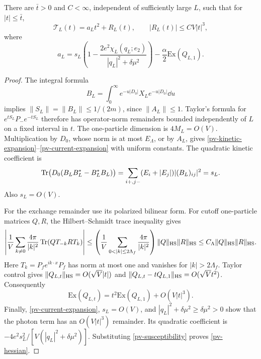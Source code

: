 \begin{lemma}
\label{pv-remainders}
There are \(\bar t>0\) and \(C<\infty\), independent of sufficiently
large \(L\), such that for \(|t|\leq\bar t\),
\begin{equation}
 \mathcal T_L(t)=a_Lt^2+R_L(t),\qquad
 |R_L(t)|\leq CV|t|^3,
 \label{pv-uniform-remainder}
\end{equation}
where
\begin{equation}
 a_L=s_L\left(1-
       \frac{2e^2\chi_L(q_L;e_2)}{|q_L|^2+\delta\mu^2}\right)
       -\frac\alpha2\mathrm{Ex}(Q_{L,1}).
 \label{pv-hessian}
\end{equation}
\end{lemma}
\begin{proof}
The integral formula
\[
 B_L=\int_0^\infty e^{-u|D_0|}X_Le^{-u|D_0|}\dd u
\]
implies \(\|S_L\|=\|B_L\|\leq1/(2m)\), since \(\|A_L\|\leq1\).
Taylor's formula for \(e^{tS_L}P_-e^{-tS_L}\) therefore has operator-norm
remainders bounded independently of \(L\) on a fixed interval in \(t\).
The one-particle dimension is \(4M_L=O(V)\). Multiplication by
\(D_0\), whose norm is at most \(E_\Lambda\), or by \(A_L\), gives
\eqref{pv-kinetic-expansion}--\eqref{pv-current-expansion} with uniform
constants. The quadratic kinetic coefficient is
\[
 \operatorname{Tr}\bigl(D_0(B_LB_L^*-B_L^*B_L)\bigr)
 =\sum_{i+,j-}(E_i+|E_j|)|(B_L)_{ij}|^2=s_L.
\]
Also \(s_L=O(V)\).

For the exchange remainder use its polarized bilinear form. For cutoff
one-particle matrices \(Q,R\), the Hilbert--Schmidt trace inequality gives
\[
 \left|\frac1V\sum_{k\ne0}\frac{4\pi}{|k|^2}
          \Tr(QT_{-k}RT_k)\right|
 \leq\left(\frac1V\sum_{0<|k|\leq2\Lambda_f}
                         \frac{4\pi}{|k|^2}\right)
                   \|Q\|_{\HS}\|R\|_{\HS}
 \leq C_\Lambda\|Q\|_{\HS}\|R\|_{\HS}.
\]
Here \(T_k=P_fe^{ik\cdot x}P_f\) has norm at most one and vanishes
for \(|k|>2\Lambda_f\). Taylor control gives
\(\|Q_{L,t}\|_{\mathrm{HS}}=O(\sqrt V|t|)\) and
\(\|Q_{L,t}-tQ_{L,1}\|_{\mathrm{HS}}=O(\sqrt Vt^2)\). Consequently
\[
 \mathrm{Ex}(Q_{L,t})
 =t^2\mathrm{Ex}(Q_{L,1})+O(V|t|^3).
\]
Finally, \eqref{pv-current-expansion}, \(s_L=O(V)\), and
\(|q_L|^2+\delta\mu^2\geq\delta\mu^2>0\) show that the photon term
has an \(O(V|t|^3)\) remainder. Its quadratic coefficient is
\(-4e^2s_L^2/[V(|q_L|^2+\delta\mu^2)]\). Substituting
\eqref{pv-susceptibility} proves \eqref{pv-hessian}.
\end{proof}

